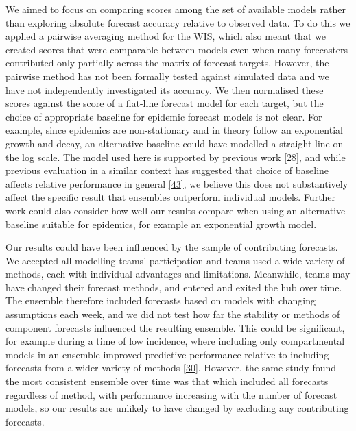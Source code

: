 \documentclass[
]{article}
\begin{document}
We aimed to focus on comparing scores among the set of available models
rather than exploring absolute forecast accuracy relative to observed
data. To do this we applied a pairwise averaging method for the WIS,
which also meant that we created scores that were comparable between
models even when many forecasters contributed only partially across the
matrix of forecast targets. However, the pairwise method has not been
formally tested against simulated data and we have not independently
investigated its accuracy. We then normalised these scores against the
score of a flat-line forecast model for each target, but the choice of
appropriate baseline for epidemic forecast models is not clear. For
example, since epidemics are non-stationary and in theory follow an
exponential growth and decay, an alternative baseline could have
modelled a straight line on the log scale. The model used here is
supported by previous work
\protect\hyperlink{ref-cramerEvaluationIndividualEnsemble2021}{{[}28{]}},
and while previous evaluation in a similar context has suggested that
choice of baseline affects relative performance in general
\protect\hyperlink{ref-bracherNationalSubnationalShortterm2021}{{[}43{]}},
we believe this does not substantively affect the specific result that
ensembles outperform individual models. Further work could also consider
how well our results compare when using an alternative baseline suitable
for epidemics, for example an exponential growth model.

Our results could have been influenced by the sample of contributing
forecasts. We accepted all modelling teams' participation and teams used
a wide variety of methods, each with individual advantages and
limitations. Meanwhile, teams may have changed their forecast methods,
and entered and exited the hub over time. The ensemble therefore
included forecasts based on models with changing assumptions each week,
and we did not test how far the stability or methods of component
forecasts influenced the resulting ensemble. This could be significant,
for example during a time of low incidence, where including only
compartmental models in an ensemble improved predictive performance
relative to including forecasts from a wider variety of methods
\protect\hyperlink{ref-taylorCombiningProbabilisticForecasts2021}{{[}30{]}}.
However, the same study found the most consistent ensemble over time was
that which included all forecasts regardless of method, with performance
increasing with the number of forecast models, so our results are
unlikely to have changed by excluding any contributing forecasts.
\end{document}
